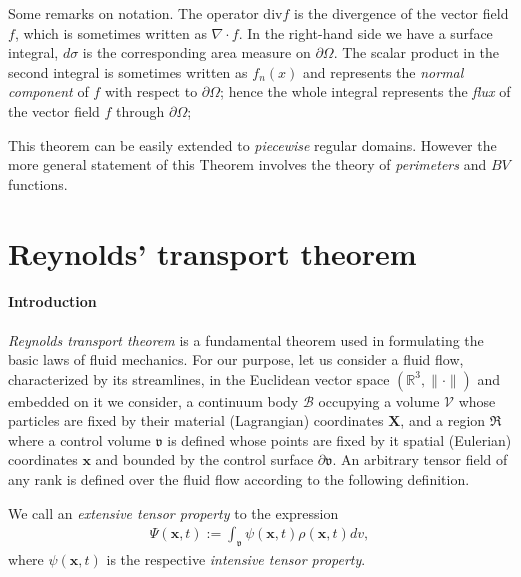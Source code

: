 Some remarks on notation.
The operator $\mathrm{div} f$ is the divergence of the vector field $f$, which is sometimes written as $\nabla \cdot f$.
In the right-hand side we have a surface integral, $d\sigma$ is the corresponding area measure on $\partial \Omega$.
The scalar product in the second integral is sometimes written as $f_n(x)$
and represents the \emph{normal component} of $f$ with respect to $\partial \Omega$; hence the whole integral represents the \emph{flux} of the vector field $f$ through $\partial \Omega$;

This theorem can be easily extended to \emph{piecewise} regular domains.
However the more general statement of this Theorem involves the theory of \emph{perimeters} and $BV$ functions.

\section{Reynolds' transport theorem}
\label{reynolds-transport}


\paragraph{Introduction}
{\em Reynolds transport theorem} \citep{Reynolds:1903} is a fundamental
theorem used in formulating the basic laws of fluid mechanics. For our
purpose, let us consider a fluid flow, characterized by its
streamlines, in the Euclidean vector space
$(\mathbb{R}^3,\lVert\cdot\rVert)$ and embedded on it we consider, a
continuum body $\mathscr{B}$ occupying a volume $\mathscr{V}$ whose
particles are fixed by their material (Lagrangian) coordinates
$\mathbf{X}$, and a region $\Re$ where a control volume $\mathfrak{v}$
is defined whose points are fixed by it spatial (Eulerian) coordinates
$\mathbf{x}$ and bounded by the control surface
$\partial\mathfrak{v}$. An arbitrary tensor field of any rank is
defined over the fluid flow according to the following definition.
\begin{definition*} We call an {\em extensive tensor property} to the expression
\begin{align}
\Psi(\mathbf{x},t):=
\int_{\mathfrak{v}}\psi(\mathbf{x},t)\rho(\mathbf{x},t)dv,
\end{align}
where $\psi(\mathbf{x},t)$ is the respective {\em intensive tensor property}.
\end{definition*}
